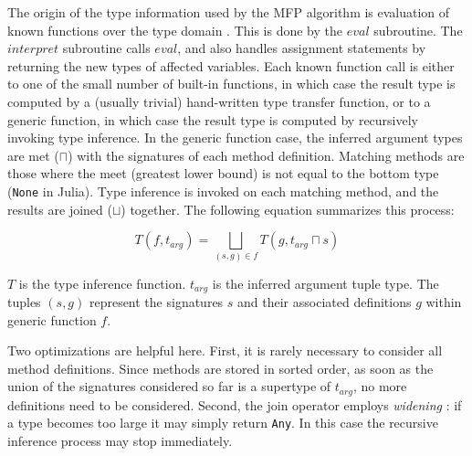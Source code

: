 \documentclass[9pt]{sigplanconf}
\begin{document}
The origin of the type information used by the MFP algorithm is
evaluation of known functions over the type domain \cite{abstractinterp}.
This is done by the $eval$ subroutine. The $interpret$ subroutine calls
$eval$, and also handles assignment statements by returning the new types
of affected variables. Each known function
call is either to one of the small number of built-in functions, in which
case the result type is computed by a (usually trivial) hand-written
type transfer function, or to a generic function, in which case the result
type is computed by recursively invoking type inference. In the generic
function case, the inferred argument types are met ($\sqcap$) with the
signatures of each method definition. Matching methods are those where the
meet (greatest lower bound)
is not equal to the bottom type ({\tt None} in Julia).
Type inference is invoked on each matching
method, and the results are joined ($\sqcup$) together. The following equation
summarizes this process:

\[
T(f,t_{arg}) = \bigsqcup_{(s,g) \in f}T(g,t_{arg} \sqcap s)
\]

\noindent
$T$ is the type inference function.
$t_{arg}$ is the inferred argument tuple type. The tuples $(s,g)$
represent the signatures $s$ and their associated definitions $g$ within
generic function $f$.

Two optimizations are helpful here. First, it is rarely
necessary to consider all method definitions. Since methods are stored in
sorted order, as soon as the union of the signatures considered so far is a
supertype of $t_{arg}$, no more definitions need to be considered.
Second, the join operator employs \emph{widening} \cite{widening}:
if a type becomes too large it may simply return {\tt Any}. In this case
the recursive inference process may stop immediately.
\end{document}
